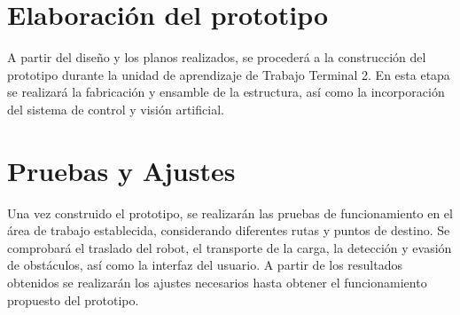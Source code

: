 \section{Elaboración del prototipo}
\label{sec:Elab_prototipo}

A partir del diseño y los planos realizados, se procederá a la construcción del prototipo durante la unidad de aprendizaje de Trabajo Terminal 2. En esta etapa se realizará la fabricación y ensamble de la estructura, así como la incorporación del sistema de control y visión artificial.


\section{Pruebas y Ajustes}
\label{sec:Pruebas_Ajustes}

Una vez construido el prototipo, se realizarán las pruebas de funcionamiento en el área de trabajo establecida, considerando diferentes rutas y puntos de destino. Se comprobará el traslado del robot, el transporte de la carga, la detección y evasión de obstáculos, así como la interfaz del usuario. A partir de los resultados obtenidos se realizarán los ajustes necesarios hasta obtener el funcionamiento propuesto del prototipo. 
